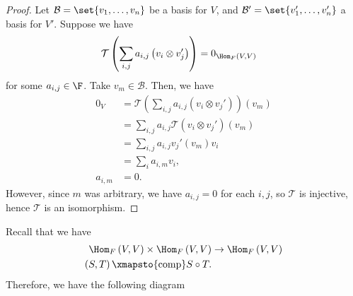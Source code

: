 \documentclass[10pt]{mypackage}
\begin{document}
\begin{proof}
    Let $\mathcal{B} = \set{v_1,\dots,v_n}$ be a basis for $V$, and $\mathcal{B}' = \set{v_1',\dots,v_n'}$ a basis for $V'$. Suppose we have
    \begin{align*}
      \mathcal{T}\left(\sum_{i,j}a_{i,j}\left(v_{i}\otimes v_{j}'\right)\right) &= 0_{\Hom_{F}\left(V,V\right)}
    \end{align*}
    for some $a_{i,j}\in \F$. Take $v_m\in \mathcal{B}$. Then, we have
    \begin{align*}
      0_{V} &= \mathcal{T}\left(\sum_{i,j}a_{i,j}\left(v_i\otimes v_j'\right)\right)\left(v_{m}\right)\\
            &= \sum_{i,j}a_{i,j}\mathcal{T}\left(v_{i}\otimes v_{j}'\right)\left(v_{m}\right)\\
            &= \sum_{i,j}a_{i,j}v_{j}'\left(v_m\right)v_i\\
            &= \sum_{i} a_{i,m}v_i,\\
      a_{i,m} &= 0.
    \end{align*}
    However, since $m$ was arbitrary, we have $a_{i,j} = 0$ for each $i,j$, so $\mathcal{T}$ is injective, hence $\mathcal{T}$ is an isomorphism.
  \end{proof}
  Recall that we have
  \begin{align*}
    \Hom_{F}\left(V,V\right) \times \Hom_{F}\left(V,V\right) &\rightarrow \Hom_{F}\left(V,V\right)\\
    \left(S,T\right) \xmapsto{\text{comp}} S\circ T.
  \end{align*}
  Therefore, we have the following diagram
  \begin{center}
  \end{center}
\end{document}
